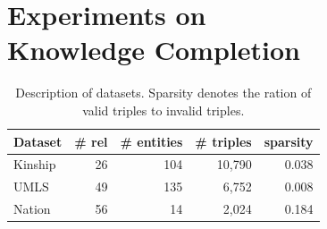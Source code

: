 \section{Experiments on \\ Knowledge Completion}
\label{sec:exp1}

\begin{table}[t]
\centering
\caption{\label{tbl:dataset}Description of datasets. 
Sparsity denotes the ration of valid triples to invalid triples.}
\vskip 0.15in
\begin{tabular}{l | r | r | r | r}
Dataset &  \# rel & \# entities & \# triples & sparsity \\ \hline
Kinship & 26 & 104  & 10,790 & 0.038 \\
UMLS & 49 &135  & 6,752 & 0.008 \\
Nation & 56 & 14  & 2,024 & 0.184 \\
\end{tabular}
\end{table}


